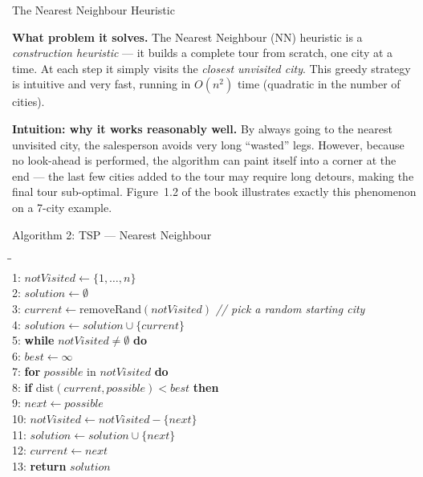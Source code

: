 \documentclass[aspectratio=169,10pt]{beamer}
\begin{document}
\begin{frame}[allowframebreaks]{The Nearest Neighbour Heuristic}

  \textbf{What problem it solves.}
  The Nearest Neighbour (NN) heuristic is a \emph{construction heuristic}
  --- it builds a complete tour from scratch, one city at a time.  At
  each step it simply visits the \emph{closest unvisited city}.  This
  greedy strategy is intuitive and very fast, running in $O(n^2)$ time
  (quadratic in the number of cities).

  \medskip
  \textbf{Intuition: why it works reasonably well.}
  By always going to the nearest unvisited city, the salesperson avoids
  very long ``wasted'' legs.  However, because no look-ahead is
  performed, the algorithm can paint itself into a corner at the end ---
  the last few cities added to the tour may require long detours,
  making the final tour sub-optimal.  Figure~1.2 of the book illustrates
  exactly this phenomenon on a 7-city example.

  \begin{block}{Algorithm 2: TSP --- Nearest Neighbour}
    \begin{tabbing}
      \hspace{2em}\=\hspace{2em}\=\hspace{2em}\= \\
      1: \> $\mathit{notVisited} \leftarrow \{1, \ldots, n\}$ \\
      2: \> $\mathit{solution} \leftarrow \emptyset$ \\
      3: \> $\mathit{current} \leftarrow \mathrm{removeRand}(\mathit{notVisited})$
                \quad \textit{// pick a random starting city} \\
      4: \> $\mathit{solution} \leftarrow \mathit{solution} \cup \{\mathit{current}\}$ \\
      5: \> \textbf{while} $\mathit{notVisited} \neq \emptyset$ \textbf{do} \\
      6: \>\> $\mathit{best} \leftarrow \infty$ \\
      7: \>\> \textbf{for} $\mathit{possible}$ in $\mathit{notVisited}$ \textbf{do} \\
      8: \>\>\> \textbf{if} $\mathrm{dist}(\mathit{current}, \mathit{possible}) < \mathit{best}$ \textbf{then} \\
      9: \>\>\>\> $\mathit{next} \leftarrow \mathit{possible}$ \\
      10:\>\> $\mathit{notVisited} \leftarrow \mathit{notVisited} - \{\mathit{next}\}$ \\
      11:\>\> $\mathit{solution} \leftarrow \mathit{solution} \cup \{\mathit{next}\}$ \\
      12:\>\> $\mathit{current} \leftarrow \mathit{next}$ \\
      13:\> \textbf{return} $\mathit{solution}$
    \end{tabbing}
  \end{block}


\end{frame}
\end{document}
